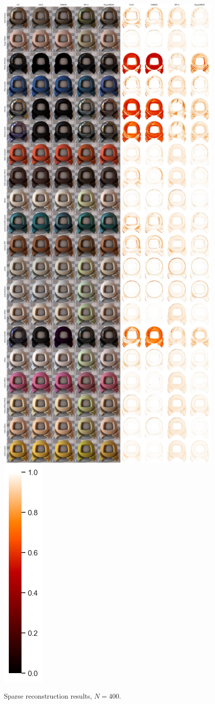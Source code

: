 \begin{figure}[ht]
  \centering

  {\includegraphics[width=0.65\linewidth]{Chapters/appendix-figs/supp_400-compressed.pdf}}
  {\includegraphics[width=0.02\linewidth]{Chapters/hyperbrdf-figs/vbar.png}}
   \caption{Sparse reconstruction results, $N = 400$.}
   \label{fig:400}
\end{figure}

